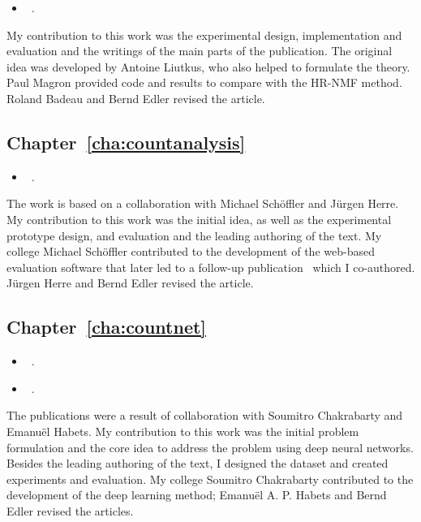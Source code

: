 \begin{itemize}
  \item[\cite{stoeter16}] ~.
\end{itemize}
\noindent
My contribution to this work was the experimental design, implementation and evaluation and the writings of the main parts of the publication.
The original idea was developed by Antoine Liutkus, who also helped to formulate the theory. Paul Magron provided code and results to compare with the HR-NMF method. Roland Badeau and Bernd Edler revised the article.

\subsection*{Chapter~\ref{cha:countanalysis}}

\begin{itemize}
  \item[\cite{stoeter13}] ~.
\end{itemize}
\noindent
The work is based on a collaboration with Michael Schöffler and Jürgen Herre.
My contribution to this work was the initial idea, as well as the experimental prototype design, and evaluation and the leading authoring of the text.
My college Michael Schöffler contributed to the development of the web-based evaluation software that later led to a follow-up publication~\cite{schoeffler13} which I co-authored. Jürgen Herre and Bernd Edler revised the article.

\subsection*{Chapter~\ref{cha:countnet}}

\begin{itemize}
  \item[\cite{stoeter19}] ~.
  \item[\cite{stoeter18}] ~.
\end{itemize}
\noindent
The publications were a result of collaboration with Soumitro Chakrabarty and Emanuël Habets. 
My contribution to this work was the initial problem formulation and the core idea to address the problem using deep neural networks. Besides the leading authoring of the text, I designed the dataset and created experiments and evaluation. 
My college Soumitro Chakrabarty contributed to the development of the deep learning method; Emanuël A. P. Habets and Bernd Edler revised the articles.


